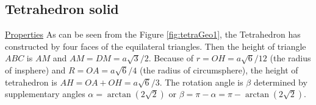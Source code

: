 
%
\clearpage
\newpage
\subsection{Tetrahedron solid}
\noindent\uline{Properties} 
As can be seen from the Figure \ref{fig:tetraGeo1}, the Tetrahedron has constructed by four faces of the equilateral triangles. Then the height of triangle $ABC$ is $AM$ and $AM=DM=a\sqrt{3}/2$.
Because of $r=OH=a\sqrt{6}/12$ (the radius of insphere) and $R=OA=a\sqrt{6}/4$ (the radius of circumsphere), the height of tetrahedron is $AH=OA+OH=a\sqrt{6}/3$. The rotation angle is $\beta$ determined by supplementary angles $\alpha=\arctan(2\sqrt{2})$ or $\beta=\pi-\alpha = \pi-\arctan(2\sqrt{2})$.
 

